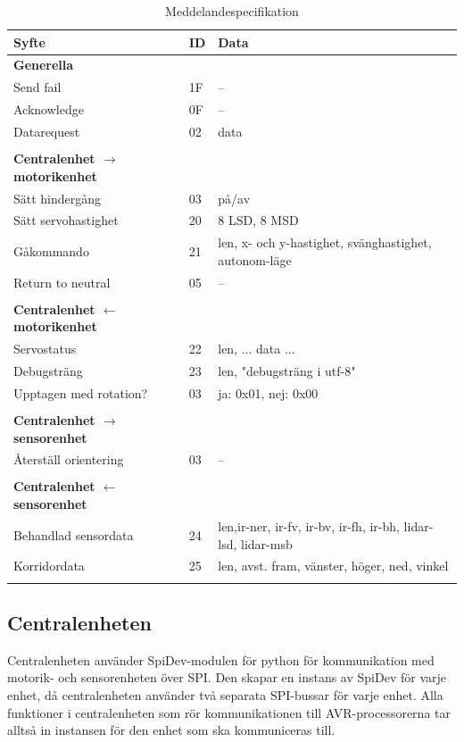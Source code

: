 \documentclass[a4paper,titlepage,12pt]{article}
\begin{document}
    \newpage
	\begin{longtable}[c]{ l l l }
		\textbf{Syfte} & \textbf{ID} & \textbf{Data} \\ \midrule
		\textbf{Generella} \\ \midrule
		Send fail & 1F & -- \\ \midrule
		Acknowledge & 0F & -- \\ \midrule
		Datarequest & 02 & data \\ \midrule
		\\
		\textbf{Centralenhet $ \to $ motorikenhet}\\ \midrule
		Sätt hindergång & 03 & på/av \\ \midrule
		Sätt servohastighet & 20 & 8 LSD, 8 MSD \\ \midrule
		Gåkommando &  21 & len, x- och y-hastighet, svänghastighet,
        autonom-läge \\ \midrule
		Return to neutral & 05 & -- \\ \midrule
		\\
		\textbf{Centralenhet $ \gets $ motorikenhet}\\ \midrule
		Servostatus & 22 & len, ... data ... \\ \midrule
		Debugsträng & 23 & len, "debugsträng i utf-8" \\ \midrule
		Upptagen med rotation? & 03 & ja: 0x01, nej: 0x00 \\ \midrule
		\\
		\textbf{Centralenhet $\to$ sensorenhet} \\ \midrule
		Återställ orientering & 03 & -- \\ \midrule
		\\
		\textbf{Centralenhet $ \gets $ sensorenhet}\\ \midrule
		Behandlad sensordata & 24 & len,ir-ner, ir-fv, ir-bv, ir-fh, ir-bh,
        lidar-lsd, lidar-msb \\ \midrule
		Korridordata		 & 25 & len, avst. fram, vänster, höger, ned, vinkel \\

		\caption{Meddelandespecifikation \label{table:messages}}
	\end{longtable}
    
    \subsection{Centralenheten}

    Centralenheten använder SpiDev-modulen för python för kommunikation med
    motorik- och sensorenheten över SPI. Den skapar en instans av SpiDev för
    varje enhet, då centralenheten använder två separata SPI-bussar för varje
    enhet. Alla funktioner i centralenheten som rör kommunikationen till AVR-processorerna tar
    alltså in instansen för den enhet som ska kommuniceras till.
\end{document}
